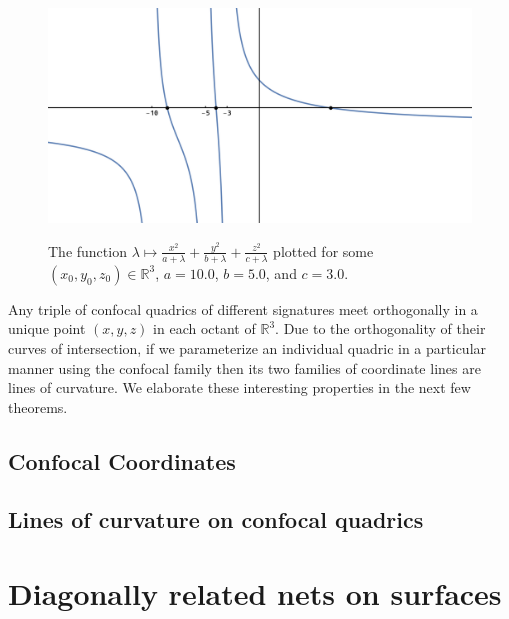 \documentclass[10pt, a4paper]{article}
\theoremstyle{BoldTopSpacing}
\theoremstyle{BoldTopSpacing}
\theoremstyle{BoldTopSpacing}
\theoremstyle{BoldTopBottomSpacing}
\theoremstyle{BoldTopSpacing}
\theoremstyle{BoldTopBottomSpacing}
\theoremstyle{remark}
\begin{document}
\begin{figure}[H]
    \centering
    \includegraphics[width=1.0\textwidth]{graph-for-proof.png}
    \label{fig:graph-for-proof}
    \caption[A plot of the real-valued function $\lambda \mapsto \frac{x^2}{a + \lambda} + \frac{y^2}{b + \lambda} + \frac{z^2}{c + \lambda}$]{The function $\lambda \mapsto \frac{x^2}{a + \lambda} + \frac{y^2}{b + \lambda} + \frac{z^2}{c + \lambda}$ plotted for some $(x_0, y_0, z_0) \in \mathbb{R}^3$, $a = 10.0$, $b = 5.0$, and $c = 3.0$.}
    \label{fig:plot}
\end{figure}

Any triple of confocal quadrics of different signatures meet orthogonally in a unique point $(x, y, z)$ in each octant of $\mathbb{R}^3$. Due to the orthogonality of their curves of intersection, if we parameterize an individual quadric in a particular manner using the confocal family then its two families of coordinate lines are lines of curvature. We elaborate these interesting properties in the next few theorems.

\subsection{Confocal Coordinates}
\label{subsec:confocal-coordinates}

\subsection{Lines of curvature on confocal quadrics}
\label{subsec:curvature-lines-on-quadrics}
\pagebreak
\section{Diagonally related nets on surfaces}
\label{sec:diagonally-related-nets}
\end{document}
